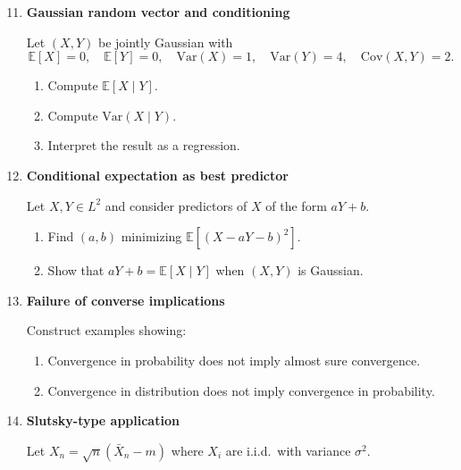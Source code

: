 \documentclass[11pt]{article}
\begin{document}
\begin{enumerate}
\setcounter{enumi}{10}

\item \textbf{Gaussian random vector and conditioning}

Let $(X,Y)$ be jointly Gaussian with
\[
\mathbb{E}[X]=0,\quad \mathbb{E}[Y]=0,\quad
\mathrm{Var}(X)=1,\quad \mathrm{Var}(Y)=4,\quad \mathrm{Cov}(X,Y)=2.
\]

\begin{enumerate}
\item Compute $\mathbb{E}[X\mid Y]$.
\item Compute $\mathrm{Var}(X\mid Y)$.
\item Interpret the result as a regression.
\end{enumerate}

\bigskip

\item \textbf{Conditional expectation as best predictor}

Let $X,Y\in L^2$ and consider predictors of $X$ of the form $aY+b$.

\begin{enumerate}
\item Find $(a,b)$ minimizing $\mathbb{E}[(X-aY-b)^2]$.
\item Show that $aY+b=\mathbb{E}[X\mid Y]$ when $(X,Y)$ is Gaussian.
\end{enumerate}

\bigskip

\item \textbf{Failure of converse implications}

Construct examples showing:
\begin{enumerate}
\item Convergence in probability does not imply almost sure convergence.
\item Convergence in distribution does not imply convergence in probability.
\end{enumerate}

\bigskip

\item \textbf{Slutsky-type application}

Let $X_n=\sqrt{n}(\bar X_n-m)$ where $X_i$ are i.i.d.\ with variance $\sigma^2$.


\end{enumerate}
\end{document}
